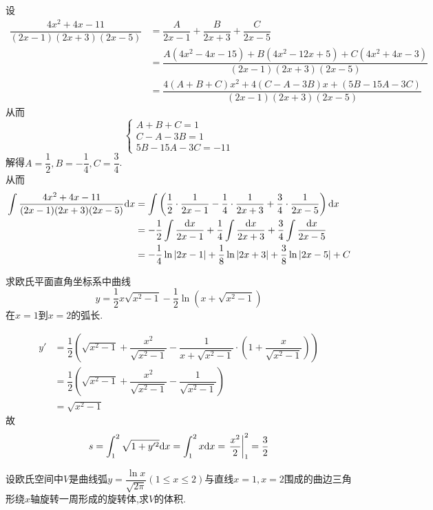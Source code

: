 \documentclass{ctexart}
\begin{document}
\begin{solution}[Solution.]
    设
    \begin{align*}
        \dfrac{4x^2+4x-11}{(2x-1)(2x+3)(2x-5)}
        &= \dfrac{A}{2x-1}+\dfrac{B}{2x+3}+\dfrac{C}{2x-5} \\
        &= \dfrac{A(4x^2-4x-15)+B(4x^2-12x+5)+C(4x^2+4x-3)}{(2x-1)(2x+3)(2x-5)} \\
        &= \dfrac{4(A+B+C)x^2+4(C-A-3B)x+(5B-15A-3C)}{(2x-1)(2x+3)(2x-5)}
    \end{align*}
    从而$$\left\{\begin{array}{l}
        A+B+C=1 \\
        C-A-3B=1 \\
        5B-15A-3C=-11
    \end{array}\right.$$
    解得$A=\dfrac{1}{2},B=-\dfrac{1}{4},C=\dfrac{3}{4}$.\\
    从而\begin{align*}
        \int{\dfrac{4x^2+4x-11}{(2x-1)(2x+3)(2x-5)}\mathrm{d}x}
        &= \int\left(\dfrac{1}{2}\cdot\dfrac{1}{2x-1}-\dfrac{1}{4}\cdot\dfrac{1}{2x+3}+\dfrac{3}{4}\cdot\dfrac{1}{2x-5}\right)\mathrm{d} x\\
        &= -\dfrac{1}{2}\int{\dfrac{\mathrm{d}x}{2x-1}}+\dfrac{1}{4}\int{\dfrac{\mathrm{d}x}{2x+3}}+\dfrac{3}{4}\int{\dfrac{\mathrm{d}x}{2x-5}} \\
        &= -\dfrac{1}{4}\ln{\left|2x-1\right|}+\dfrac{1}{8}\ln{\left|2x+3\right|}+\dfrac{3}{8}\ln{\left|2x-5\right|}+C
    \end{align*}
\end{solution}
\begin{problem}[5.(10\songti{分})]
    求欧氏平面直角坐标系中曲线$$y=\dfrac{1}{2}x\sqrt{x^2-1}-\dfrac{1}{2}\ln{\left(x+\sqrt{x^2-1}\right)}$$在$x=1$到$x=2$的弧长.
\end{problem}
\begin{solution}[Solution.]
    \begin{align*}
        y'
        &= \dfrac{1}{2}\left(\sqrt{x^2-1}+\dfrac{x^2}{\sqrt{x^2-1}}-\dfrac{1}{x+\sqrt{x^2-1}}\cdot\left(1+\dfrac{x}{\sqrt{x^2-1}}\right)\right) \\
        &= \dfrac{1}{2}\left(\sqrt{x^2-1}+\dfrac{x^2}{\sqrt{x^2-1}}-\dfrac{1}{\sqrt{x^2-1}}\right) \\
        &= \sqrt{x^2-1}
    \end{align*}
    故$$s=\int_{1}^{2}{\sqrt{1+y'^2}\mathrm{d} x}=\int_{1}^{2}{x\mathrm{d} x}=\left.\dfrac{x^2}{2}\right|_1^2=\dfrac{3}{2}$$
\end{solution}
\begin{problem}[6.(10\songti{分})]
    设欧氏空间中$V$是曲线弧$\displaystyle y=\dfrac{\ln{x}}{\sqrt{2\pi}}(1\leqslant x\leqslant 2)$与直线$x=1,x=2$围成的曲边三角形绕$x$轴旋转一周形成的旋转体,求$V$的体积.
\end{problem}
\end{document}
